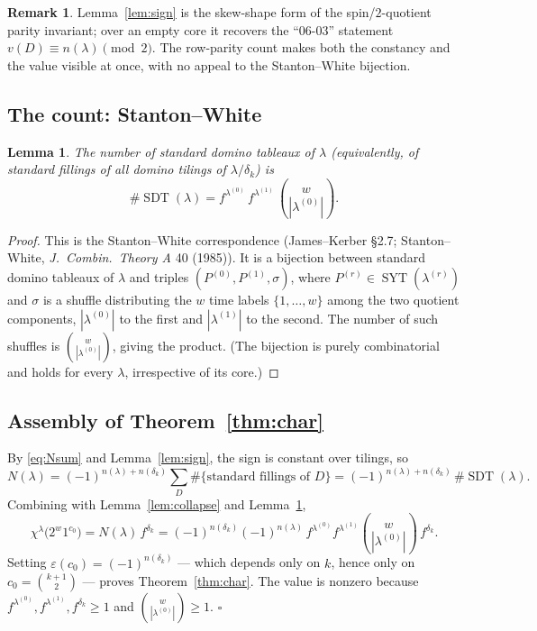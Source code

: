 \documentclass[11pt]{article}
\newtheorem{lemma}{Lemma}
\theoremstyle{definition}
\newtheorem{remark}{Remark}
\DeclareMathOperator{\SYT}{SYT}
\DeclareMathOperator{\SDT}{SDT}
\newcommand{\la}{\lambda}
\begin{document}
\begin{remark}
Lemma~\ref{lem:sign} is the skew-shape form of the spin/$2$-quotient parity
invariant; over an empty core it recovers the ``06-03'' statement
$v(D)\equiv n(\la)\pmod2$. The row-parity count makes both the constancy and the
value visible at once, with no appeal to the Stanton--White bijection.
\end{remark}

\subsection{The count: Stanton--White}

\begin{lemma}\label{lem:count}
The number of standard domino tableaux of $\la$ (equivalently, of standard
fillings of all domino tilings of $\la/\delta_k$) is
\[
  \#\SDT(\la)=f^{\la^{(0)}}\,f^{\la^{(1)}}\,\binom{w}{|\la^{(0)}|}.
\]
\end{lemma}

\begin{proof}
This is the Stanton--White correspondence (James--Kerber \S2.7; Stanton--White,
\emph{J.\ Combin.\ Theory A} 40 (1985)). It is a bijection between standard
domino tableaux of $\la$ and triples $(P^{(0)},P^{(1)},\sigma)$, where
$P^{(r)}\in\SYT(\la^{(r)})$ and $\sigma$ is a shuffle distributing the $w$ time
labels $\{1,\dots,w\}$ among the two quotient components, $|\la^{(0)}|$ to the
first and $|\la^{(1)}|$ to the second. The number of such shuffles is
$\binom{w}{|\la^{(0)}|}$, giving the product. (The bijection is purely
combinatorial and holds for every $\la$, irrespective of its core.)
\end{proof}

\subsection{Assembly of Theorem~\ref{thm:char}}

By \eqref{eq:Nsum} and Lemma~\ref{lem:sign}, the sign is constant over tilings,
so
\[
  N(\la)=(-1)^{n(\la)+n(\delta_k)}\sum_D\#\{\text{standard fillings of }D\}
        =(-1)^{n(\la)+n(\delta_k)}\,\#\SDT(\la).
\]
Combining with Lemma~\ref{lem:collapse} and Lemma~\ref{lem:count},
\[
  \chi^\la\!\big(2^{w}1^{c_0}\big)
   =N(\la)\,f^{\delta_k}
   =(-1)^{n(\delta_k)}(-1)^{n(\la)}\,
     f^{\la^{(0)}}f^{\la^{(1)}}\binom{w}{|\la^{(0)}|}\,f^{\delta_k}.
\]
Setting $\varepsilon(c_0)=(-1)^{n(\delta_k)}$ --- which depends only on $k$,
hence only on $c_0=\binom{k+1}{2}$ --- proves Theorem~\ref{thm:char}. The value
is nonzero because $f^{\la^{(0)}},f^{\la^{(1)}},f^{\delta_k}\ge1$ and
$\binom{w}{|\la^{(0)}|}\ge1$. \qquad$\square$
\end{document}
